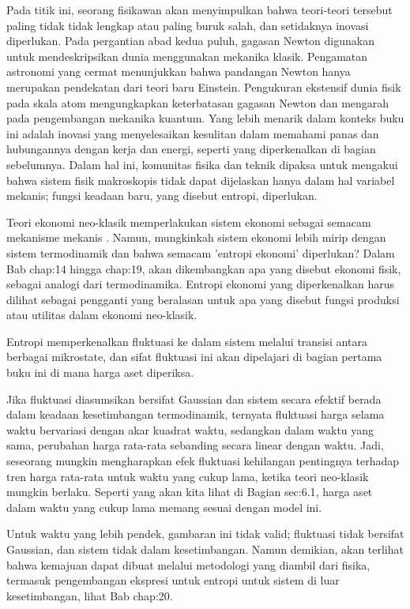 \documentclass[a4paper,12pt]{book}
\begin{document}
Pada titik ini, seorang fisikawan akan menyimpulkan bahwa teori-teori tersebut paling tidak tidak lengkap atau paling buruk salah, dan setidaknya inovasi diperlukan. Pada pergantian abad kedua puluh, gagasan Newton digunakan untuk mendeskripsikan dunia menggunakan mekanika klasik. Pengamatan astronomi yang cermat menunjukkan bahwa pandangan Newton hanya merupakan pendekatan dari teori baru Einstein. Pengukuran ekstensif dunia fisik pada skala atom mengungkapkan keterbatasan gagasan Newton dan mengarah pada pengembangan mekanika kuantum. Yang lebih menarik dalam konteks buku ini adalah inovasi yang menyelesaikan kesulitan dalam memahami panas dan hubungannya dengan kerja dan energi, seperti yang diperkenalkan di bagian sebelumnya. Dalam hal ini, komunitas fisika dan teknik dipaksa untuk mengakui bahwa sistem fisik makroskopis tidak dapat dijelaskan hanya dalam hal variabel mekanis; fungsi keadaan baru, yang disebut entropi, diperlukan.

Teori ekonomi neo-klasik memperlakukan sistem ekonomi sebagai semacam mekanisme mekanis \cite{backhouse2002, cleaver2011}. Namun, mungkinkah sistem ekonomi lebih mirip dengan sistem termodinamik dan bahwa semacam 'entropi ekonomi' diperlukan? Dalam Bab  {chap:14} hingga  {chap:19}, akan dikembangkan apa yang disebut ekonomi fisik, sebagai analogi dari termodinamika. Entropi ekonomi yang diperkenalkan harus dilihat sebagai pengganti yang beralasan untuk apa yang disebut fungsi produksi atau utilitas dalam ekonomi neo-klasik.

Entropi memperkenalkan fluktuasi ke dalam sistem melalui transisi antara berbagai mikrostate, dan sifat fluktuasi ini akan dipelajari di bagian pertama buku ini di mana harga aset diperiksa.

Jika fluktuasi diasumsikan bersifat Gaussian dan sistem secara efektif berada dalam keadaan kesetimbangan termodinamik, ternyata fluktuasi harga selama waktu bervariasi dengan akar kuadrat waktu, sedangkan dalam waktu yang sama, perubahan harga rata-rata sebanding secara linear dengan waktu. Jadi, seseorang mungkin mengharapkan efek fluktuasi kehilangan pentingnya terhadap tren harga rata-rata untuk waktu yang cukup lama, ketika teori neo-klasik mungkin berlaku. Seperti yang akan kita lihat di Bagian  {sec:6.1}, harga aset dalam waktu yang cukup lama memang sesuai dengan model ini.

Untuk waktu yang lebih pendek, gambaran ini tidak valid; fluktuasi tidak bersifat Gaussian, dan sistem tidak dalam kesetimbangan. Namun demikian, akan terlihat bahwa kemajuan dapat dibuat melalui metodologi yang diambil dari fisika, termasuk pengembangan ekspresi untuk entropi untuk sistem di luar kesetimbangan, lihat Bab  {chap:20}.
\end{document}
